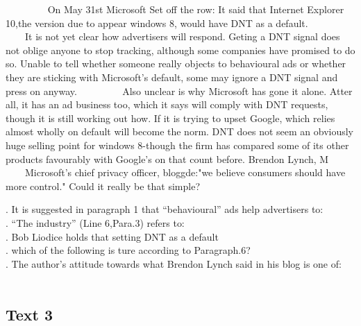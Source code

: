     
    On May 31st Microsoft Set off the row: It said that Internet Explorer 10,the version due to appear windows 8, would have DNT as a default.
    
    It is not yet clear how advertisers will respond. Geting a DNT signal does not oblige anyone to stop tracking, although some companies have promised to do so. Unable to tell whether someone really objects to behavioural ads or whether they are sticking with Microsoft’s default, some may ignore a DNT signal and press on anyway.
    
    Also unclear is why Microsoft has gone it alone. Atter all, it has an ad business too, which it says will comply with DNT requests, though it is still working out how. If it is trying to upset Google, which relies almost wholly on default will become the norm. DNT does not seem an obviously huge selling point for windows 8-though the firm has compared some of its other products favourably with Google's on that count before. Brendon Lynch, M
    
    Microsoft's chief privacy officer, bloggde:"we believe consumers should have more control." Could it really be that simple?
    
    \begin{questions} . It is suggested in paragraph 1 that “behavioural” ads help advertisers to:
    \\ . “The industry” (Line 6,Para.3) refers to:
    \\ . Bob Liodice holds that setting DNT as a default
    \\ . which of the following is ture according to Paragraph.6?
    \\ . The author's attitude towards what Brendon Lynch said in his blog is one of:
    \\ \end{questions}      \subsection{Text 3}
